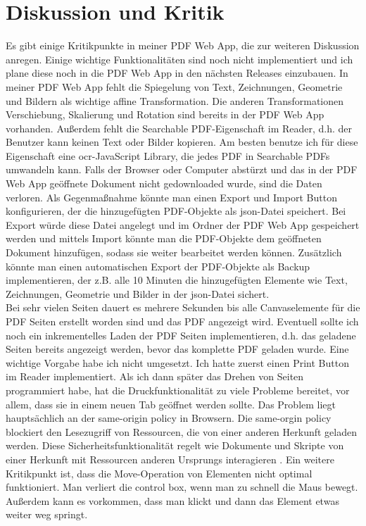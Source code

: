 \chapter*{Diskussion und Kritik}
Es gibt einige Kritikpunkte in meiner PDF Web App, die zur weiteren Diskussion anregen. Einige wichtige Funktionalitäten sind noch nicht implementiert und ich plane diese noch in die PDF Web App in den nächsten Releases einzubauen. In meiner PDF Web App fehlt die Spiegelung von Text, Zeichnungen, Geometrie und Bildern als wichtige affine Transformation. Die anderen Transformationen Verschiebung, Skalierung und Rotation sind bereits in der PDF Web App vorhanden. Außerdem fehlt die Searchable PDF-Eigenschaft im Reader, d.h. der Benutzer kann keinen Text oder Bilder kopieren. Am besten benutze ich für diese Eigenschaft eine \gls{ocr}-JavaScript Library, die jedes PDF in Searchable PDFs umwandeln kann. Falls der Browser oder Computer abstürzt und das in der PDF Web App geöffnete Dokument nicht gedownloaded wurde, sind die Daten verloren. Als Gegenmaßnahme könnte man einen Export und Import Button konfigurieren, der die hinzugefügten PDF-Objekte als \gls{json}-Datei speichert. Bei Export würde diese Datei angelegt und im Ordner der PDF Web App gespeichert werden und mittels Import könnte man die PDF-Objekte dem geöffneten Dokument hinzufügen, sodass sie weiter bearbeitet werden können. Zusätzlich könnte man einen automatischen Export der PDF-Objekte als Backup implementieren, der z.B. alle 10 Minuten die hinzugefügten Elemente wie Text, Zeichnungen, Geometrie und Bilder in der \gls{json}-Datei sichert. \\
Bei sehr vielen Seiten dauert es mehrere Sekunden bis alle Canvaselemente für die PDF Seiten erstellt worden sind und das PDF angezeigt wird. Eventuell sollte ich noch ein inkrementelles Laden der PDF Seiten implementieren, d.h. das geladene Seiten bereits angezeigt werden, bevor das komplette PDF geladen wurde. Eine wichtige Vorgabe habe ich nicht umgesetzt. Ich hatte zuerst einen Print Button im Reader implementiert. Als ich dann später das Drehen von Seiten programmiert habe, hat die Druckfunktionalität zu viele Probleme bereitet, vor allem, dass sie in einem neuen Tab geöffnet werden sollte. Das Problem liegt hauptsächlich an der same-origin policy in Browsern. Die same-orgin policy blockiert den Lesezugriff von Ressourcen, die von einer anderen Herkunft geladen werden. Diese Sicherheitsfunktionalität regelt wie Dokumente und Skripte von einer Herkunft mit Ressourcen anderen Ursprungs interagieren \cite{same-origin}. Ein weitere Kritikpunkt ist, dass die Move-Operation von Elementen nicht optimal funktioniert. Man verliert die control box, wenn man zu schnell die Maus bewegt. Außerdem kann es vorkommen, dass man klickt und dann das Element etwas weiter weg springt. \\
